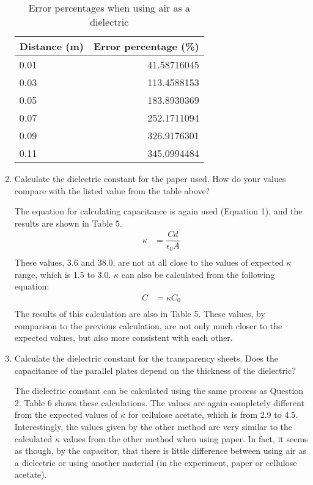 \documentclass [12pt, letterpaper, twoside] {article}
\begin{document}
\begin{enumerate}
  \begin{table}
    \centering
    \begin{tabular}{| l | r |}
      \hline\hline
      Distance (m) & Error percentage (\%) \\
      \hline
      0.01 & 41.58716045 \\
      \hline
      0.03 & 113.4588153 \\
      \hline
      0.05 & 183.8930369 \\
      \hline
      0.07 & 252.1711094 \\
      \hline
      0.09 & 326.9176301 \\
      \hline
      0.11 & 345.0994484 \\
      \hline\hline
    \end{tabular}
    \caption{Error percentages when using air as a dielectric}
  \end{table}
   
  \item  Calculate the dielectric constant for the paper used.  How do your values compare with the listed value from the table above?
  
  The equation for calculating capacitance is again used (Equation 1), and the results are shown in Table 5.
  \begin{equation*}
    \begin{split}
      \kappa &= \dfrac{Cd}{\epsilon_{0}A} \\
    \end{split}
  \end{equation*}
  These values, 3.6 and 38.0, are not at all close to the values of expected \(\kappa\) range, which is 1.5 to 3.0. \(\kappa\) can also be calculated from the following equation:
  \begin{equation*}
    \begin{split}
      C &= \kappa{C}_0 \\
    \end{split}
  \end{equation*}
  The results of this calculation are also in Table 5. These values, by comparison to the previous calculation, are not only much closer to the expected values, but also more consistent with each other.
  
  \item Calculate the dielectric constant for the transparency sheets.  Does the capacitance of the parallel plates depend on the thickness of the dielectric?

  The dielectric constant can be calculated using the same process as Question 2. Table 6 shows these calculations. The values are again completely different from the expected values of \(\kappa\) for cellulose acetate, which is from 2.9 to 4.5. Interestingly, the values given by the other method are very similar to the calculated \(\kappa\) values from the other method when using paper. In fact, it seems as though, by the capacitor, that there is little difference between using air as a dielectric or using another material (in the experiment, paper or cellulose acetate).


\end{enumerate}
\end{document}
